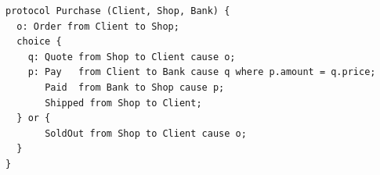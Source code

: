 \begin{lstlisting}[language={}]
protocol Purchase (Client, Shop, Bank) {
  o: Order from Client to Shop;
  choice {
    q: Quote from Shop to Client cause o;
    p: Pay   from Client to Bank cause q where p.amount = q.price;
       Paid  from Bank to Shop cause p;
       Shipped from Shop to Client;
  } or {
       SoldOut from Shop to Client cause o;
  }
}
\end{lstlisting}

